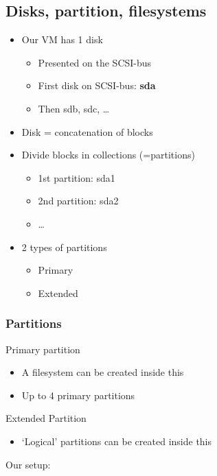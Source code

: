 \documentclass{article}
\begin{document}
\subsection{Disks, partition, filesystems}

\begin{itemize}
    \item Our VM has 1 disk
    \begin{itemize}
        \item Presented on the SCSI-bus
        \item First disk on SCSI-bus: \textbf{sda}
        \item Then sdb, sdc, \dots
    \end{itemize}
    \item Disk = concatenation of blocks
    \item Divide blocks in collections (=partitions)
    \begin{itemize}
        \item 1st partition: sda1
        \item 2nd partition: sda2
        \item \dots
    \end{itemize}
    \item 2 types of partitions
    \begin{itemize}
        \item Primary
        \item Extended
    \end{itemize}
\end{itemize}

\subsubsection{Partitions}

Primary partition

\begin{itemize}
    \item A filesystem can be created inside this
    \item Up to 4 primary partitions
\end{itemize}

Extended Partition

\begin{itemize}
    \item `Logical' partitions can be created inside this
\end{itemize}

Our setup:
\end{document}
